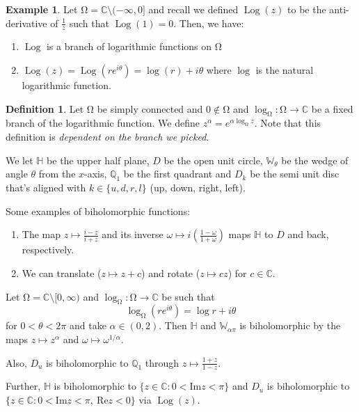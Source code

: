 \documentclass[letterpaper,12pt]{article}
\theoremstyle{definition}
\newtheorem{definition}{Definition}[section]
\newtheorem{example}{Example}[section]
\theoremstyle{plain}
\theoremstyle{remark}
\newcommand{\C}{\mathbb{C}}
\let\oldOmega\Omega
\renewcommand{\Omega}{\mathrm{\oldOmega}}
\DeclareMathOperator\Log{Log}
\begin{document}
\begin{example}
Let $\Omega = \C\setminus (-\infty,0]$ and recall we defined $\Log(z)$ to be the anti-derivative of $\frac1z$ such that $\Log(1) = 0$. Then, we have:
\begin{enumerate}
  \item $\Log$ is a branch of logarithmic functions on $\Omega$
  \item $\Log(z) = \Log(re^{i\theta}) = \log(r) + i\theta$ where $\log$ is the natural logarithmic function.
\end{enumerate}
\end{example}

\begin{definition}
Let $\Omega$ be simply connected and $0\notin\Omega$ and $\log_\Omega:\Omega\to\C$ be a fixed branch of the logarithmic function. We define $z^\alpha = e^{\alpha\log_\Omega z}$. Note that this definition is \emph{dependent on the branch we picked}.
\end{definition}

We let $\mathbb{H}$ be the upper half plane, $D$ be the open unit circle, $\mathbb{W}_\theta$ be the wedge of angle $\theta$ from the $x$-axis, $\mathbb{Q}_1$ be the first quadrant and $D_{k}$ be the semi unit disc that's aligned with $k\in\{u,d,r,l\}$ (up, down, right, left).

Some examples of biholomorphic functions:

\begin{enumerate}
  \item The map $z\mapsto \frac{i-z}{i+z}$ and its inverse $\omega\mapsto i \left(\frac{1-\omega}{1+\omega}\right)$ maps $\mathbb{H}$ to $D$ and back, respectively.
  \item We can translate ($z\mapsto z+c$) and rotate ($z\mapsto cz$) for $c\in \C$.
\end{enumerate}

Let $\Omega = \C\setminus[0,\infty)$ and $\log_\Omega:\Omega\to\C$ be such that
\[\log_\Omega(re^{i\theta}) = \log r + i\theta\]
for $0<\theta<2\pi$ and take $\alpha\in(0,2)$. Then $\mathbb{H}$ and $\mathbb{W}_{\alpha \pi}$ is biholomorphic by the maps $z\mapsto z^\alpha$ and $\omega\mapsto \omega^{1/\alpha}$.

Also, $D_u$ is biholomorphic to $\mathbb{Q}_1$ through $z\mapsto \frac{1+z}{1-z}$.

Further, $\mathbb{H}$ is biholomorphic to $\{z\in\C:0<\mathrm{Im} z <\pi \}$ and $D_u$ is biholomorphic to $\{z\in\C:0<\mathrm{Im} z <\pi,\ \mathrm{Re} z<0 \}$ via $\Log(z)$.
\end{document}
